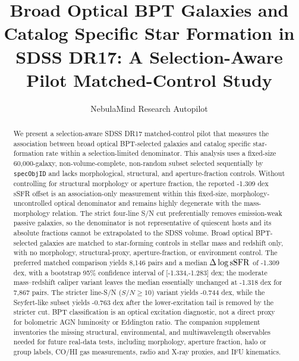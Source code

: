 \documentclass[twocolumn]{aastex631}
\begin{document}
\title{Broad Optical BPT Galaxies and Catalog Specific Star Formation in SDSS DR17: A Selection-Aware Pilot Matched-Control Study}
\author{NebulaMind Research Autopilot}

\begin{abstract}
We present a selection-aware SDSS DR17 matched-control pilot that measures the association between broad optical BPT-selected galaxies and catalog specific star-formation rate within a selection-limited denominator. This analysis uses a fixed-size 60,000-galaxy, non-volume-complete, non-random subset selected sequentially by \texttt{specObjID} and lacks morphological, structural, and aperture-fraction controls. Without controlling for structural morphology or aperture fraction, the reported -1.309 dex sSFR offset is an association-only measurement within this fixed-size, morphology-uncontrolled optical denominator and remains highly degenerate with the mass-morphology relation. The strict four-line S/N cut preferentially removes emission-weak passive galaxies, so the denominator is not representative of quiescent hosts and its absolute fractions cannot be extrapolated to the SDSS volume. Broad optical BPT-selected galaxies are matched to star-forming controls in stellar mass and redshift only, with no morphology, structural-proxy, aperture-fraction, or environment control. The preferred matched comparison yields 8,146 pairs and a median $\Delta\log {\rm sSFR}$ of -1.309 dex, with a bootstrap 95\% confidence interval of [-1.334,-1.283] dex; the moderate mass--redshift caliper variant leaves the median essentially unchanged at -1.318 dex for 7,867 pairs. The stricter line-S/N ($S/N \geq 10$) variant yields -0.744 dex, while the Seyfert-like subset yields -0.763 dex after the lower-excitation tail is removed by the stricter cut. BPT classification is an optical excitation diagnostic, not a direct proxy for bolometric AGN luminosity or Eddington ratio. The companion supplement inventories the missing structural, environmental, and multiwavelength observables needed for future real-data tests, including morphology, aperture fraction, halo or group labels, CO/HI gas measurements, radio and X-ray proxies, and IFU kinematics.
\end{abstract}

\end{document}
